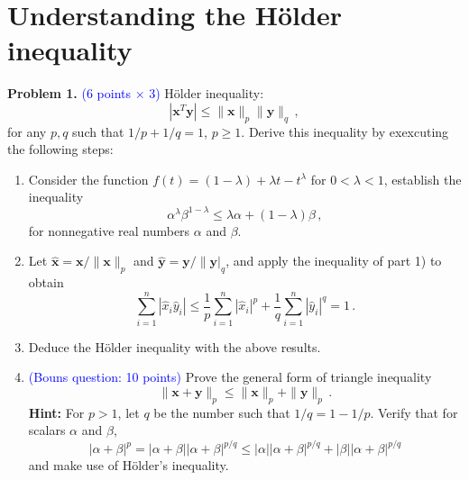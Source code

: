 \documentclass[english,onecolumn]{IEEEtran}
\begin{document}
\section{Understanding the H\"{o}lder inequality}
\noindent\textbf{Problem 1.} \textcolor{blue}{(6 points $\times$ 3)}
H\"{o}lder inequality:
\[
|\mathbf{x}^T\mathbf{y}| \le \|\mathbf{x}\|_p \|\mathbf{y}\|_q\,, 
\]
for any $p,q$ such that $1/p + 1/q = 1$, $p\ge 1$.
Derive this inequality by exexcuting the following steps:
\begin{enumerate}
	\item Consider the function $f(t) = (1-\lambda) + \lambda t -t^\lambda$ for $0<\lambda <1$, establish the inequality 
	\[
	\alpha^\lambda \beta^{1-\lambda}  \le \lambda \alpha +(1-\lambda)\beta\,,
	\]
	for nonnegative real numbers $\alpha$ and $\beta$.
	\item Let $\hat{\mathbf{x}} = \mathbf{x}/ \|\mathbf{x}\|_p$ and $\hat{\mathbf{y}} = \mathbf{y}/ \|\mathbf{y}|_q$, and apply the inequality of part 1) to obtain 
	\[
	\sum_{i=1}^n |\hat{x}_i \hat{y}_i| \le \frac{1}{p} \sum_{i=1}^n |\hat{x}_i|^p + \frac{1}{q} \sum_{i=1}^n |\hat{y}_i|^q = 1\,. 
	\]
	\item Deduce the H\"{o}lder inequality with the above results.
	\item \textcolor{blue}{(Bouns question: 10 points)} Prove the general form of triangle inequality 
	\[
	\| \mathbf{x} + \mathbf{y}\|_p \le \| \mathbf{x}\|_p + \|\mathbf{y}\|_p\,.
	\]
	\textbf{Hint:} For $p>1$, let $q$ be the number such that $1/q = 1- 1/p$. Verify that for scalars $\alpha$ and $\beta$,
	\[
	|\alpha + \beta|^p = |\alpha + \beta||\alpha + \beta|^{p/q} \le |\alpha||\alpha+\beta|^{p/q} + |\beta||\alpha+\beta|^{p/q}
	\]
	and make use of H\"{o}lder's inequality.
\end{enumerate}
\end{document}
